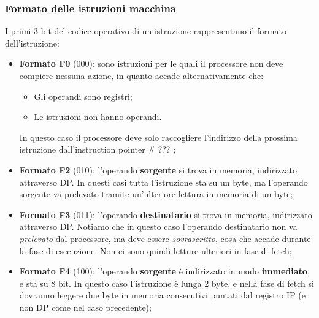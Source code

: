 \documentclass[a4paper,11pt]{article}
\begin{document}
\subsubsection{Formato delle istruzioni macchina}
I primi 3 bit del codice operativo di un istruzione rappresentano il formato dell'istruzione:
\begin{itemize}
	\item \textbf{Formato F0} (000): sono istruzioni per le quali il processore non deve compiere nessuna azione, in quanto accade alternativamente che:
		\begin{itemize}
			\item Gli operandi sono registri;
			\item Le istruzioni non hanno operandi.
		\end{itemize}
		In questo caso il processore deve solo raccogliere l'indirizzo della prossima istruzione dall'instruction pointer # ??? ;
	\item \textbf{Formato F2} (010): l'operando \textbf{sorgente} si trova in memoria, indirizzato attraverso DP.
		In questi casi tutta l'istruzione sta su un byte, ma l'operando sorgente va prelevato tramite un'ulteriore lettura in memoria di un byte;
	\item \textbf{Formato F3} (011): l'operando \textbf{destinatario} si trova in memoria, indirizzato attraverso DP.
	Notiamo che in questo caso l'operando destinatario non va \textit{prelevato} dal processore, ma deve essere \textit{sovrascritto}, cosa che accade durante la fase di esecuzione.
	Non ci sono quindi letture ulteriori in fase di fetch;
\item \textbf{Formato F4} (100): l'operando \textbf{sorgente} è indirizzato in modo \textbf{immediato}, e sta su 8 bit.
	In questo caso l'istruzione è lunga 2 byte, e nella fase di fetch si dovranno leggere due byte in memoria consecutivi puntati dal registro IP (e non DP come nel caso precedente);


\end{itemize}
\end{document}
